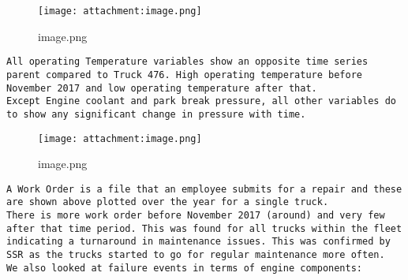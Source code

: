 \documentclass[11pt]{article}
\makeatletter
\def\maxwidth{\ifdim\Gin@nat@width>\linewidth\linewidth
    \else\Gin@nat@width\fi}
\let\Oldincludegraphics\includegraphics
\renewcommand{\includegraphics}[1]{\Oldincludegraphics[width=.8\maxwidth]{#1}}
\makeatother
\begin{document}
    \begin{figure}
\centering
\texttt{[image: attachment:image.png]}
\caption{image.png}
\end{figure}

    \begin{verbatim}
All operating Temperature variables show an opposite time series parent compared to Truck 476. High operating temperature before November 2017 and low operating temperature after that.
Except Engine coolant and park break pressure, all other variables do to show any significant change in pressure with time. 
\end{verbatim}

    \begin{figure}
\centering
\texttt{[image: attachment:image.png]}
\caption{image.png}
\end{figure}

    \begin{verbatim}
A Work Order is a file that an employee submits for a repair and these are shown above plotted over the year for a single truck.
There is more work order before November 2017 (around) and very few after that time period. This was found for all trucks within the fleet indicating a turnaround in maintenance issues. This was confirmed by SSR as the trucks started to go for regular maintenance more often.
We also looked at failure events in terms of engine components:
\end{verbatim}
\end{document}
